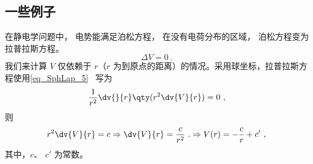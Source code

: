 \subsection{一些例子}
\begin{example}{}
在静电学问题中， 电势能满足泊松方程， 在没有电荷分布的区域， 泊松方程变为拉普拉斯方程。
\begin{equation}
\Delta V=0~.
\end{equation}
我们来计算 $V$ 仅依赖于 $r$（$r$ 为到原点的距离）的情况。采用球坐标，拉普拉斯方程使用\autoref{eq_SphLap_5}~ 写为
\begin{equation}
\frac{1}{r^2}\dv{}{r}\qty(r^2\dv{V}{r})=0~,
\end{equation}
则
\begin{equation}
r^2\dv{V}{r}=c\Rightarrow \dv{V}{r}=\frac{c}{r^2}~.
\Rightarrow V(r)=-\frac{c}{r}+c'~,
\end{equation}
其中，$c$、 $c'$ 为常数。
\end{example}
